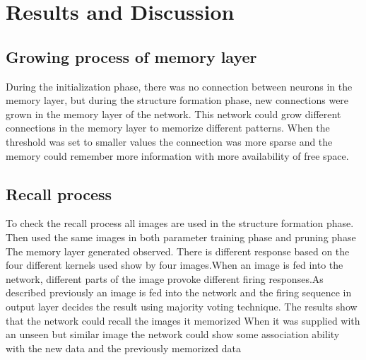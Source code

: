 \chapter{Results and Discussion}

\section{Growing process of memory layer}
During the initialization phase, there was no connection between neurons in the
memory layer, but during the structure formation phase, new connections were
grown in the memory layer of the network. This network could grow different
connections in the memory layer to memorize different patterns. When the
threshold was set to smaller values the connection was more sparse and the
memory could remember more information with more availability of free space.
\section{Recall process}
To check the recall process all images are used in the structure formation
phase. Then used the same images in both parameter training phase and pruning
phase The memory layer generated observed. There is different response based on
the four different kernels used show by four images.When an image is fed into
the network, different parts of the image provoke different firing responses.As
described previously an image is fed into the network and the firing sequence
in output layer decides the result using majority voting technique. The results
show that the network could recall the images it memorized When it was supplied
with an unseen but similar image the network could show some association
ability with the new data and the previously memorized data

